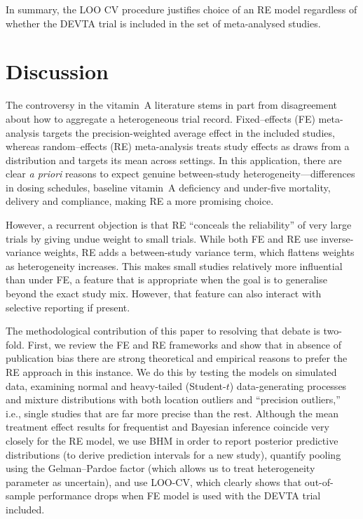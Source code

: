 \documentclass[12pt]{article}
\begin{document}
In summary, the LOO CV procedure justifies choice of an RE model regardless of whether the DEVTA trial is included in the set of meta-analysed studies.



\section{Discussion}

The controversy in the vitamin~A literature stems in part from disagreement about how to aggregate a heterogeneous trial record. Fixed–effects (FE) meta-analysis targets the precision-weighted average effect in the included studies, whereas random–effects (RE) meta-analysis treats study effects as draws from a distribution and targets its mean across settings. In this application, there are clear \emph{a priori} reasons to expect genuine between-study heterogeneity—differences in dosing schedules, baseline vitamin~A deficiency and under-five mortality, delivery and compliance, making RE a more promising choice.

However, a recurrent objection is that RE ``conceals the reliability'' of very large trials by giving undue weight to small trials. While both FE and RE use inverse-variance weights, RE adds a between-study variance term, which flattens weights as heterogeneity increases. This makes small studies relatively more influential than under FE, a feature that is appropriate when the goal is to generalise beyond the exact study mix. However, that feature can also interact with selective reporting if present.

The methodological contribution of this paper to resolving that debate is two-fold. First, we review the FE and RE frameworks and show that in absence of publication bias there are strong theoretical and empirical reasons to prefer the RE approach in this instance. We do this by testing the models on simulated data, examining normal and heavy-tailed (Student-$t$) data-generating processes and mixture distributions with both location outliers and “precision outliers,” i.e., single studies that are far more precise than the rest. Although the mean treatment effect results for frequentist and Bayesian inference coincide very closely for the RE model, we use BHM in order to report posterior predictive distributions (to derive  prediction intervals for a new study), quantify pooling using the Gelman–Pardoe factor (which allows us to treat heterogeneity parameter as uncertain), and use LOO-CV, which clearly shows that out-of-sample performance drops when FE model is used with the DEVTA trial included.
\end{document}
